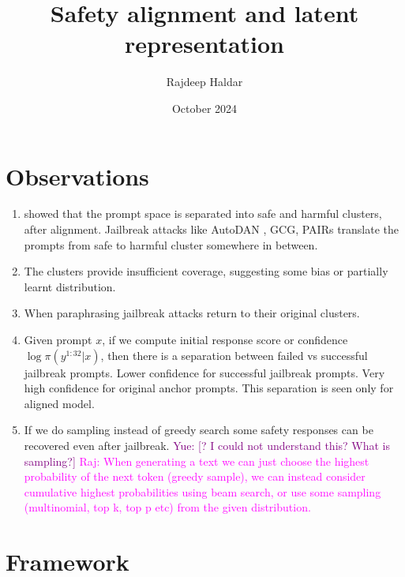 \documentclass{article}
\title{Safety alignment and latent representation}
\author{Rajdeep Haldar}
\date{October 2024}
\newcommand{\yue}[1]{\textcolor{purple}{Yue: #1}}
\newcommand{\raj}[1]{\textcolor{magenta}{Raj: #1}}
\begin{document}
\maketitle

\section{Observations}
\begin{enumerate}
    \item \cite{Lin2024TowardsAnalysis} showed that the prompt space is separated into safe and harmful clusters, after alignment. Jailbreak attacks like AutoDAN \citep{Liu2023AutoDAN:Models}, GCG\citep{Zou2023UniversalModels}, PAIRs \citep{Chao2023JailbreakingQueries} translate the prompts from safe to harmful cluster somewhere in between.
    \item The clusters provide insufficient coverage, suggesting some bias or partially learnt distribution.
    \item When paraphrasing jailbreak attacks return to their original clusters.
    \item Given prompt $x$, if we compute initial response score or confidence $\log \pi(y^{1:32}|x)$, then there is a separation between failed vs successful jailbreak prompts. Lower confidence for successful jailbreak prompts. Very high confidence for original anchor prompts. This separation is seen only for aligned model.
    \item If we do sampling instead of greedy search some safety responses can be recovered even after jailbreak. \yue{[? I could not understand this? What is sampling?]} \raj{When generating a text we can just choose the highest probability of the next token (greedy sample), we can instead consider cumulative highest probabilities using beam search, or use some sampling (multinomial, top k, top p etc) from the given distribution.}
\end{enumerate}
\section{Framework}
\end{document}
